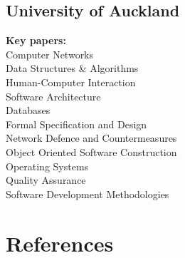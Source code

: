 \documentclass[letterpaper]{deedy-resume} %
\begin{document}
\begin{minipage}[t]{0.32\textwidth}
\subsection{University of Auckland}
\vspace{0.5em}
\textbf{Key papers:} \\
\vspace{0.1em}
Computer Networks \\
Data Structures \& Algorithms \\
Human-Computer Interaction \\
Software Architecture \\
\vspace{0.5em}
Databases \\
Formal Specification and Design \\
Network Defence and Countermeasures \\
Object Oriented Software Construction \\
Operating Systems \\
Quality Assurance \\
Software Development Methodologies \\

\sectionspace %



\section{References}


\end{minipage} %
\hfill
%
%
\end{document}
